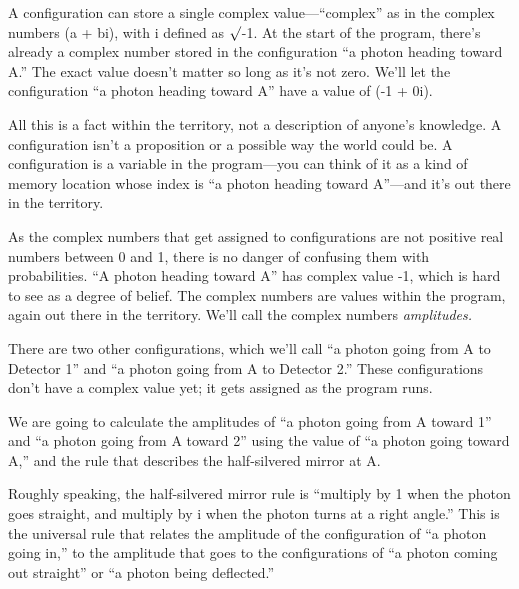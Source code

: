 {
 A configuration can store a single complex
value---``complex'' as in the
complex numbers (a + bi), with i defined as ${\surd}$-1. At the start
of the program, there's already a complex number stored
in the configuration ``a photon heading toward
A.'' The exact value doesn't matter
so long as it's not zero. We'll let the
configuration ``a photon heading toward
A'' have a value of (-1 + 0i).}

{
 All this is a fact within the territory, not a description of
anyone's knowledge. A configuration
isn't a proposition or a possible way the world could
be. A configuration is a variable in the program---you can think of it
as a kind of memory location whose index is ``a photon
heading toward A''---and it's out
there in the territory.}

{
 As the complex numbers that get assigned to configurations are not
positive real numbers between 0 and 1, there is no danger of confusing
them with probabilities. ``A photon heading toward
A'' has complex value -1, which is hard to see as a
degree of belief. The complex numbers are values within the program,
again out there in the territory. We'll call the
complex numbers \textit{amplitudes.}}

{
 There are two other configurations, which we'll
call ``a photon going from A to Detector
1'' and ``a photon going from A to
Detector 2.'' These configurations
don't have a complex value yet; it gets assigned as the
program runs.}

{
 We are going to calculate the amplitudes of ``a
photon going from A toward 1'' and
``a photon going from A toward 2''
using the value of ``a photon going toward
A,'' and the rule that describes the half-silvered
mirror at A.}

{
 Roughly speaking, the half-silvered mirror rule is
``multiply by 1 when the photon goes straight, and
multiply by i when the photon turns at a right
angle.'' This is the universal rule that relates the
amplitude of the configuration of ``a photon going
in,'' to the amplitude that goes to the
configurations of ``a photon coming out
straight'' or ``a photon being
deflected.''}

